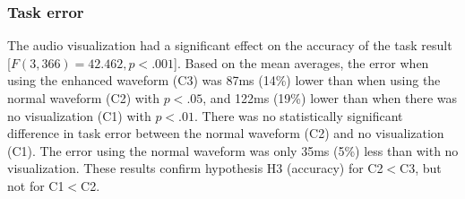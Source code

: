 \subsubsection{Task error}
The audio visualization had a significant effect on the accuracy of the task result [$F(3,366)=42.462, p<.001$].
Based on the mean averages, the error when using the enhanced waveform (C3) was 87ms (14\%) lower than when using the
normal waveform (C2) with $p<.05$, and 122ms (19\%) lower than when there was no visualization (C1) with $p<.01$. There
was no statistically significant difference in task error between the normal waveform (C2) and no visualization (C1).
The error using the normal waveform was only 35ms (5\%) less than with no visualization.  These results confirm
hypothesis H3 (accuracy) for C2$<$C3, but not for C1$<$C2.




